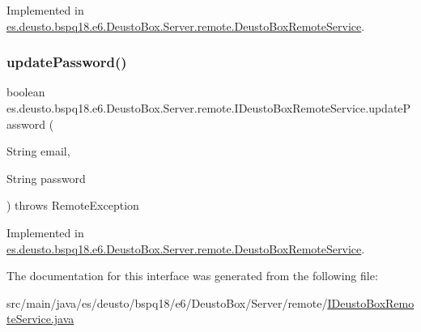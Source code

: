 Implemented in \mbox{\hyperlink{classes_1_1deusto_1_1bspq18_1_1e6_1_1_deusto_box_1_1_server_1_1remote_1_1_deusto_box_remote_service_a68b337e7b4cb85957579b60863d7e0a0}{es.\+deusto.\+bspq18.\+e6.\+Deusto\+Box.\+Server.\+remote.\+Deusto\+Box\+Remote\+Service}}.

\mbox{\label{interfacees_1_1deusto_1_1bspq18_1_1e6_1_1_deusto_box_1_1_server_1_1remote_1_1_i_deusto_box_remote_service_aa73e5a3a839d93e49a0f0005e54e3e07}} 
\subsubsection{\texorpdfstring{update\+Password()}{updatePassword()}}
{\footnotesize\ttfamily boolean es.\+deusto.\+bspq18.\+e6.\+Deusto\+Box.\+Server.\+remote.\+I\+Deusto\+Box\+Remote\+Service.\+update\+Password (\begin{DoxyParamCaption}\item[{String}]{email,  }\item[{String}]{password }\end{DoxyParamCaption}) throws Remote\+Exception}



Implemented in \mbox{\hyperlink{classes_1_1deusto_1_1bspq18_1_1e6_1_1_deusto_box_1_1_server_1_1remote_1_1_deusto_box_remote_service_ae0e6d493d943f30b092a6041d0d3328e}{es.\+deusto.\+bspq18.\+e6.\+Deusto\+Box.\+Server.\+remote.\+Deusto\+Box\+Remote\+Service}}.



The documentation for this interface was generated from the following file\+:\begin{DoxyCompactItemize}
\item 
src/main/java/es/deusto/bspq18/e6/\+Deusto\+Box/\+Server/remote/\mbox{\hyperlink{_i_deusto_box_remote_service_8java}{I\+Deusto\+Box\+Remote\+Service.\+java}}\end{DoxyCompactItemize}
